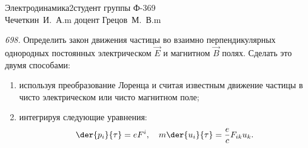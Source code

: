 




\usepackage{mathrsfs}

\newcommand{\ds}{\displaystyle}
\newcommand{\inv}{\mathrm{inv}}
\renewcommand{\v}{\mathrm{v}}
\newcommand{\E}{\mathscr{E}}


{Электродинамика}{2}{}{студент группы Ф-369\\Чечеткин~И.~А.}{m}
{доцент Грецов~М.~В.}{m}

\newpage
\emph{698.} Определить закон движения частицы во взаимно перпендикулярных
однородных постоянных электрическом \( \vec{E} \) и магнитном \( \vec{B} \)
полях. Сделать это двумя способами:
\vspace*{-1em}
\begin{enumerate}\itemsep-.5em
    \item используя преобразование Лоренца и считая известным движение частицы в
    чисто электрическом или чисто магнитном поле;
    \item интегрируя следующие уравнения:
    \begin{equation}
        \der{p_i}{\tau} = eF^i, \quad
        m\der{u_i}{\tau} = \frac{e}{c}F_{ik}u_k.
        \label{eq:1_task}
    \end{equation}
\end{enumerate}

